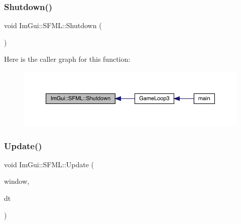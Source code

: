 \mbox{\label{namespace_im_gui_1_1_s_f_m_l_a2e9801a991d524d4f26a5933cdf29e3d}} 
\subsubsection{\texorpdfstring{Shutdown()}{Shutdown()}}
{\footnotesize\ttfamily void Im\+Gui\+::\+S\+F\+M\+L\+::\+Shutdown (\begin{DoxyParamCaption}{ }\end{DoxyParamCaption})}

Here is the caller graph for this function\+:
\nopagebreak
\begin{figure}[H]
\begin{center}
\leavevmode
\includegraphics[width=350pt]{d1/d76/namespace_im_gui_1_1_s_f_m_l_a2e9801a991d524d4f26a5933cdf29e3d_icgraph}
\end{center}
\end{figure}
\mbox{\label{namespace_im_gui_1_1_s_f_m_l_a6ac5b3b4d267251063f3697b9fa0ac7d}} 
\subsubsection{\texorpdfstring{Update()}{Update()}\hspace{0.1cm}{\footnotesize\ttfamily [1/3]}}
{\footnotesize\ttfamily void Im\+Gui\+::\+S\+F\+M\+L\+::\+Update (\begin{DoxyParamCaption}\item[{sf\+::\+Render\+Window \&}]{window,  }\item[{sf\+::\+Time}]{dt }\end{DoxyParamCaption})}

